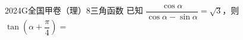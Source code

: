 
\begin{problem}{2024}{G}{全国甲卷（理）}{8}{三角函数}
已知 $\dfrac{\cos\alpha}{\cos\alpha-\sin\alpha}=\sqrt{3}$，则 $\tan\left(\alpha+\dfrac{\pi}{4}\right)=$
\begin{choices}
\end{choices}
\end{problem}